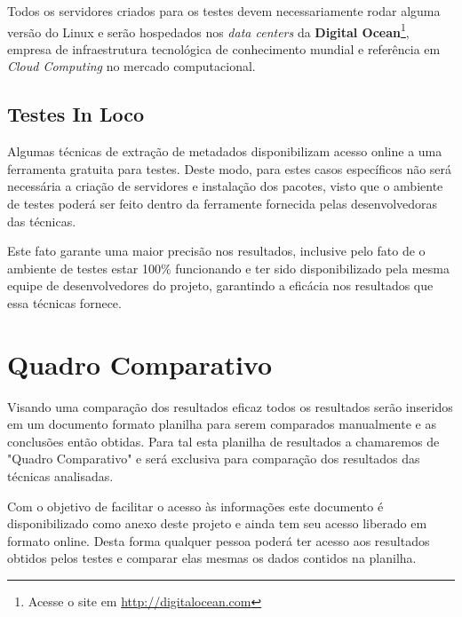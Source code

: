 \documentclass[
	12pt,               %
	openright,          %
	twoside,            %
	a4paper,            %
	english,            %
	brazil              %
	]{abntex2}
\begin{document}
 
Todos os servidores criados para os testes devem necessariamente rodar alguma versão do Linux e serão hospedados nos \textit{data centers} da \textbf{Digital Ocean}\footnote{Acesse o site em \url{http://digitalocean.com}}, empresa de infraestrutura tecnológica de conhecimento mundial e referência em \textit{Cloud Computing} no mercado computacional.

\subsection{Testes In Loco}


Algumas técnicas de extração de metadados disponibilizam acesso online a uma ferramenta gratuita para testes. Deste modo, para estes casos específicos não será necessária a criação de servidores e instalação dos pacotes, visto que o ambiente de testes poderá ser feito dentro da ferramente fornecida pelas desenvolvedoras das técnicas.


Este fato garante uma maior precisão nos resultados, inclusive pelo fato de o ambiente de testes estar 100\% funcionando e ter sido disponibilizado pela mesma equipe de desenvolvedores do projeto, garantindo a eficácia nos resultados que essa técnicas fornece.

\section{Quadro Comparativo}

Visando uma comparação dos resultados eficaz todos os resultados serão inseridos em um documento formato planilha para serem comparados manualmente e as conclusões então obtidas. Para tal esta planilha de resultados a chamaremos de "Quadro Comparativo" e será exclusiva para comparação dos resultados das técnicas analisadas.


Com o objetivo de facilitar o acesso às informações este documento é disponibilizado como anexo deste projeto e ainda tem seu acesso liberado em formato online. Desta forma qualquer pessoa poderá ter acesso aos resultados obtidos pelos testes e comparar elas mesmas os dados contidos na planilha.
\end{document}
